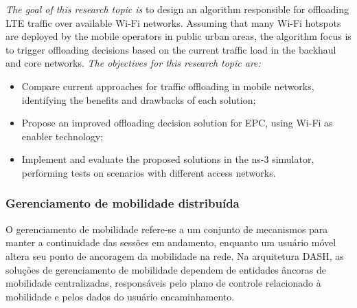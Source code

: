 \emph{The goal of this research topic is} to design an algorithm responsible
for offloading \ac{LTE} traffic over available Wi-Fi networks. Assuming that
many Wi-Fi hotspots are deployed by the mobile operators in public urban areas,
the algorithm focus is to trigger offloading decisions based on the current
traffic load in the backhaul and core networks.
\emph{The objectives for this research topic are:}
\begin{itemize}
  \item Compare current approaches for traffic offloading in mobile networks,
  identifying the benefits and drawbacks of each solution;

  \item Propose an improved offloading decision solution for \ac{EPC}, using
  Wi-Fi as enabler technology;

  \item Implement and evaluate the proposed solutions in the \ac{ns-3}
  simulator, performing tests on scenarios with different access networks.
\end{itemize}

\subsubsection{Gerenciamento de mobilidade distribuída}
\label{subsec:handover}

O gerenciamento de mobilidade refere-se a um conjunto de mecanismos para manter a continuidade das sessões em andamento, enquanto um usuário móvel altera seu ponto de ancoragem da mobilidade na rede.
Na arquitetura DASH, as soluções de gerenciamento de mobilidade dependem de entidades âncoras de mobilidade centralizadas, responsáveis pelo plano de controle relacionado à mobilidade e pelos dados do usuário encaminhamento. 


